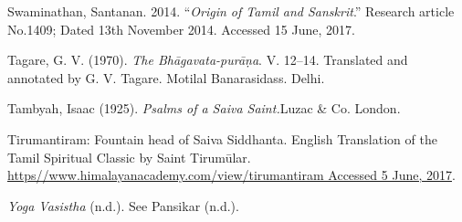 \begin{thebibliography}{99}
  Swaminathan, Santanan. 2014. “\textit{Origin of Tamil and Sanskrit}.” Research article No.1409; Dated 13th November 2014. Accessed 15 June, 2017.

  Tagare, G. V. (1970). \textit{The Bhāgavata-purāṇa}. V. 12–14. Translated and annotated by G. V. Tagare. Motilal Banarasidass. Delhi.

  Tambyah, Isaac (1925). \textit{Psalms of a Saiva Saint.}Luzac \& Co. London.

  Tirumantiram: Fountain head of Saiva Siddhanta. English Translation of the Tamil Spiritual Classic by Saint Tirumūlar. \url{https//www.himalayanacademy.com/view/tirumantiram Accessed 5 June, 2017}.

  \textit{Yoga Vasistha} (n.d.). See Pansikar (n.d.).

 \end{thebibliography}

\theendnotes

